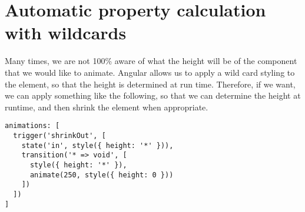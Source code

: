 \section{Automatic property calculation with wildcards}

Many times, we are not 100\% aware of what the height will be of the component
that we would like to animate. Angular allows us to apply a wild card styling 
to the element, so that the height is determined at run time. Therefore, if 
we want, we can apply something like the following, so that we can determine 
the height at runtime, and then shrink the element when appropriate. 

\begin{lstlisting}
animations: [
  trigger('shrinkOut', [
    state('in', style({ height: '*' })),
    transition('* => void', [
      style({ height: '*' }),
      animate(250, style({ height: 0 }))
    ])
  ])
]
\end{lstlisting}


